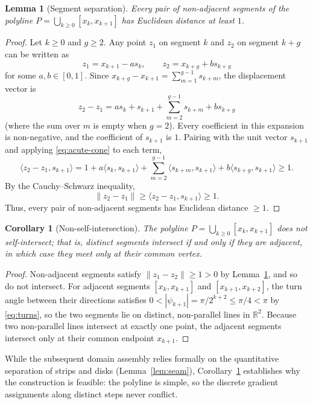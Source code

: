 \documentclass[11pt]{article}
\newtheorem{lemma}[theorem]{Lemma}
\newtheorem{corollary}[theorem]{Corollary}
\newcommand{\R}{\mathbb{R}}
\newcommand{\ip}[2]{\langle #1,#2\rangle}
\begin{document}
\begin{lemma}[Segment separation]
\label{lem:geom}
Every pair of non-adjacent segments of the polyline $P = \bigcup_{k\ge0}[x_k, x_{k+1}]$ has Euclidean distance at least $1$.
\end{lemma}

\begin{proof}
Let $k \ge 0$ and $g \ge 2$.
Any point $z_1$ on segment $k$ and $z_2$ on segment $k+g$ can be written as
\[
z_1 = x_{k+1} - as_k, \qquad z_2 = x_{k+g} + bs_{k+g}
\]
for some $a, b \in [0, 1]$.
Since $x_{k+g} - x_{k+1} = \sum_{m=1}^{g-1} s_{k+m}$, the displacement vector is
\[
z_2 - z_1 = as_k + s_{k+1} + \sum_{m=2}^{g-1} s_{k+m} + bs_{k+g}
\]
(where the sum over $m$ is empty when $g = 2$).
Every coefficient in this expansion is non-negative, and the coefficient of $s_{k+1}$ is $1$.
Pairing with the unit vector $s_{k+1}$ and applying \eqref{eq:acute-cone} to each term,
\[
\ip{z_2 - z_1}{s_{k+1}} = 1 + a\ip{s_k}{s_{k+1}} + \sum_{m=2}^{g-1} \ip{s_{k+m}}{s_{k+1}} + b\ip{s_{k+g}}{s_{k+1}} \ge 1.
\]
By the Cauchy--Schwarz inequality,
\[
\|z_2 - z_1\| \ge \ip{z_2 - z_1}{s_{k+1}} \ge 1.
\]
Thus, every pair of non-adjacent segments has Euclidean distance $\ge 1$.
\end{proof}

\begin{corollary}[Non-self-intersection]
\label{cor:nonself}
The polyline $P = \bigcup_{k\ge0}[x_k, x_{k+1}]$ does not self-intersect; that is, distinct segments intersect if and only if they are adjacent, in which case they meet only at their common vertex.
\end{corollary}

\begin{proof}
Non-adjacent segments satisfy $\|z_1 - z_2\| \ge 1 > 0$ by Lemma~\ref{lem:geom}, and so do not intersect.
For adjacent segments $[x_k, x_{k+1}]$ and $[x_{k+1}, x_{k+2}]$, the turn angle between their directions satisfies $0 < |\psi_{k+1}| = \pi/2^{k+2} \le \pi/4 < \pi$ by \eqref{eq:turns}, so the two segments lie on distinct, non-parallel lines in $\R^2$.
Because two non-parallel lines intersect at exactly one point, the adjacent segments intersect only at their common endpoint $x_{k+1}$.
\end{proof}

While the subsequent domain assembly relies formally on the quantitative separation of strips and disks (Lemma~\ref{lem:seam}), Corollary~\ref{cor:nonself} establishes why the construction is feasible: the polyline is simple, so the discrete gradient assignments along distinct steps never conflict.
\end{document}
